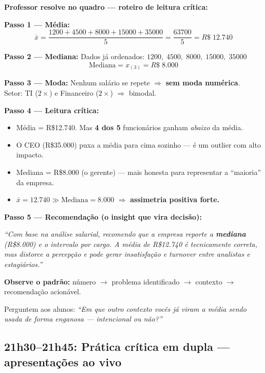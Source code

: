 \begin{SolvedBox}
\textbf{Professor resolve no quadro — roteiro de leitura crítica:}

\textbf{Passo 1 — Média:}
\[
\bar{x} = \frac{1200 + 4500 + 8000 + 15000 + 35000}{5}
= \frac{63700}{5} = R\$\;12.740
\]

\textbf{Passo 2 — Mediana:}
Dados já ordenados: $1200,\; 4500,\; 8000,\; 15000,\; 35000$
\[
\text{Mediana} = x_{(3)} = R\$\;8.000
\]

\textbf{Passo 3 — Moda:}
Nenhum salário se repete $\Rightarrow$ \textbf{sem moda numérica}.\\
Setor: TI ($2\times$) e Financeiro ($2\times$) $\Rightarrow$ bimodal.

\textbf{Passo 4 — Leitura crítica:}
\begin{itemize}
  \item Média = R\$12.740. Mas \textbf{4 dos 5} funcionários ganham
  \emph{abaixo} da média.
  \item O CEO (R\$35.000) puxa a média para cima sozinho — é um outlier com
  alto impacto.
  \item Mediana = R\$8.000 (o gerente) — mais honesta para representar
  a ``maioria'' da empresa.
  \item $\bar{x} = 12.740 \gg \text{Mediana} = 8.000$ $\Rightarrow$
  \textbf{assimetria positiva forte.}
\end{itemize}

\textbf{Passo 5 — Recomendação (o insight que vira decisão):}

\begin{center}
\textit{``Com base na análise salarial, recomendo que a empresa reporte a
\textbf{mediana} (R\$8.000) e o intervalo por cargo. A média de R\$12.740
é tecnicamente correta, mas distorce a percepção e pode gerar insatisfação
e turnover entre analistas e estagiários.''}
\end{center}

\textbf{Observe o padrão:} número $\rightarrow$ problema identificado
$\rightarrow$ contexto $\rightarrow$ recomendação acionável.
\end{SolvedBox}

Perguntem aos alunos: \textit{``Em que outro contexto vocês já viram a média
sendo usada de forma enganosa — intencional ou não?''}

\subsection{21h30–21h45: Prática crítica em dupla — apresentações ao vivo}

